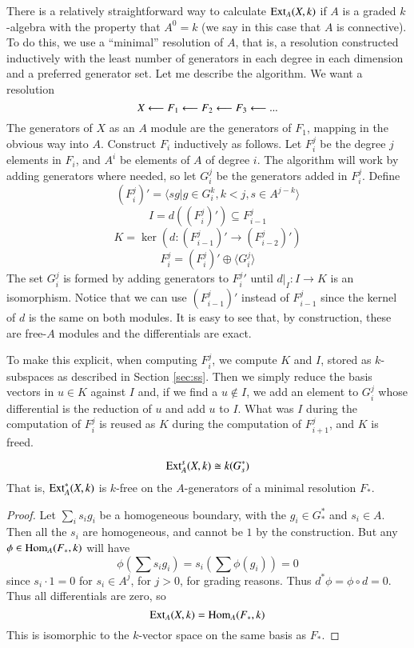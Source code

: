 There is a relatively straightforward way to calculate $\operatorname{Ext}\nolimits_A(X,k)$ if $A$ is a graded $k$-algebra with the property that $A^0=k$ (we say in this case that $A$ is connective).  
To do this, we use a ``minimal'' resolution of $A$, that is, a resolution constructed inductively with the least number of generators in each degree in each dimension and a preferred generator set.  
Let me describe the algorithm.
We want a resolution
\[X\longleftarrow F_1\longleftarrow F_2\longleftarrow F_3\longleftarrow ...\]
The generators of $X$ as an $A$ module are the generators of $F_1$, mapping in the obvious way into $A$.  
Construct $F_i$ inductively as follows.  Let $F_i^j$ be the degree $j$ elements in $F_i$, and $A^i$ be elements of $A$ of degree $i$.  
The algorithm will work by adding generators where needed, so let $G_i^j$ be the generators added in $F_i^j$.  Define
\[(F_i^j)'=\langle sg|g\in G^k_i, k<j, s\in A^{j-k} \rangle\]
\[I=d((F_i^j)')\subseteq F_{i-1}^{j}\]
\[K=\ker(d:(F_{i-1}^{j})'\to (F_{i-2}^{j})')\]
\[F_i^j= (F_i^j)'\oplus \langle G_i^j\rangle\]
The set $G_i^j$ is formed by adding generators to ${F_i^j}'$ until $d|_I:I\to K$ is an isomorphism.  
Notice that we can use $(F_{i-1}^{j})'$ instead of $F_{i-1}^{j}$ since the kernel of $d$ is the same on both modules.  
It is easy to see that, by construction, these are free-$A$ modules and the differentials are exact.  

To make this explicit, when computing $F^j_i$, we compute $K$ and $I$, stored as $k$-subspaces as described in Section \ref{sec:ss}.
Then we simply reduce the basis vectors in $u\in K$ against $I$ and, if we find a $u\notin I$, we add an element to $G_i^j$ whose differential is the reduction of $u$ and add $u$ to $I$.  
What was $I$ during the computation of $F_i^j$ is reused as $K$ during the computation of $F_{i+1}^j$, and $K$ is freed.  

\begin{Lemma}
  \[\operatorname{Ext}\nolimits^s_A(X,k)\cong k(G_s^*)\]
  That is, $\operatorname{Ext}\nolimits^*_A(X,k)$ is $k$-free on the $A$-generators of a minimal resolution $F_*$.  
\end{Lemma}
\begin{proof}
  Let $\sum_i s_ig_i$ be a homogeneous boundary, with the $g_i\in G_*^*$ and $s_i\in A$.  
  Then all the $s_i$ are homogeneous, and cannot be $1$ by the construction.  
  But any $\phi\in \operatorname{Hom}\nolimits_A(F_*,k)$ will have 
  \[\phi\left(\sum s_ig_i\right)=s_i\left(\sum \phi(g_i)\right)=0\]
  since $s_i\cdot 1=0$ for $s_i\in A^j$, for $j>0$, for grading reasons.
  Thus  $d^*\phi=\phi\circ d=0$.  
  Thus all differentials are zero, so
  \[\operatorname{Ext}\nolimits_A(X,k)=\operatorname{Hom}\nolimits_A(F_*,k)\]
  This is isomorphic to the $k$-vector space on the same basis as $F_*$.  
\end{proof}

